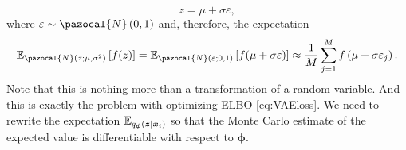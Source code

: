 \begin{equation}\label{eq:VAE_reparam1D}
z = \mu + \sigma\varepsilon,
\end{equation}
where $\varepsilon\sim\pazocal{N}\left(0,1\right)$ and, therefore, the expectation
\begin{equation}
    \mathbb{E}_{\pazocal{N}\left(z;\mu, \sigma^2\right)}\left[f(z)\right] = \mathbb{E}_{\pazocal{N}\left(\varepsilon;0, 1\right)}\left[f(\mu + \sigma\varepsilon)\right] \approx \frac{1}{M}\sum_{j=1}^M f\left(\mu + \sigma\varepsilon_j\right).
\end{equation}
Note that this is nothing more than a transformation of a random variable. And this is exactly the problem with optimizing ELBO \eqref{eq:VAEloss}. We need to rewrite the expectation $\mathbb{E}_{q_{\boldsymbol{\phi}}\left(\boldsymbol{z}\vert\boldsymbol{x}_i \right)}$ so that the Monte Carlo estimate of the expected value is differentiable with respect to $\boldsymbol{\phi}$.

